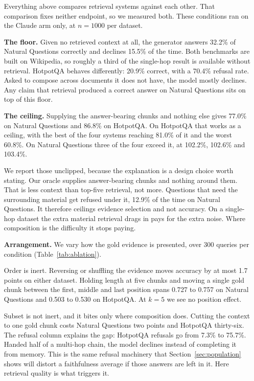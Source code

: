 \label{sec:anchors}

Everything above compares retrieval systems against each other. That comparison fixes neither endpoint, so we measured both. These conditions ran on the Claude arm only, at $n = 1000$ per dataset.

\textbf{The floor.} Given no retrieved context at all, the generator answers 32.2\% of Natural Questions correctly and declines 15.5\% of the time. Both benchmarks are built on Wikipedia, so roughly a third of the single-hop result is available without retrieval. HotpotQA behaves differently: 20.9\% correct, with a 70.4\% refusal rate. Asked to compose across documents it does not have, the model mostly declines. Any claim that retrieval produced a correct answer on Natural Questions sits on top of this floor.

\textbf{The ceiling.} Supplying the answer-bearing chunks and nothing else gives 77.0\% on Natural Questions and 86.8\% on HotpotQA. On HotpotQA that works as a ceiling, with the best of the four systems reaching 81.0\% of it and the worst 60.8\%. On Natural Questions three of the four exceed it, at 102.2\%, 102.6\% and 103.4\%.

We report those unclipped, because the explanation is a design choice worth stating. Our oracle supplies answer-bearing chunks and nothing around them. That is less context than top-five retrieval, not more. Questions that need the surrounding material get refused under it, 12.9\% of the time on Natural Questions. It therefore ceilings evidence selection and not accuracy. On a single-hop dataset the extra material retrieval drags in pays for the extra noise. Where composition is the difficulty it stops paying.

\textbf{Arrangement.} We vary how the gold evidence is presented, over 300 queries per condition (Table~\ref{tab:ablation}).

Order is inert. Reversing or shuffling the evidence moves accuracy by at most 1.7 points on either dataset. Holding length at five chunks and moving a single gold chunk between the first, middle and last position spans 0.727 to 0.757 on Natural Questions and 0.503 to 0.530 on HotpotQA. At $k = 5$ we see no position effect.

Subset is not inert, and it bites only where composition does. Cutting the context to one gold chunk costs Natural Questions two points and HotpotQA thirty-six. The refusal column explains the gap: HotpotQA refusals go from 7.3\% to 75.7\%. Handed half of a multi-hop chain, the model declines instead of completing it from memory. This is the same refusal machinery that Section~\ref{sec:population} shows will distort a faithfulness average if those answers are left in it. Here retrieval quality is what triggers it.

